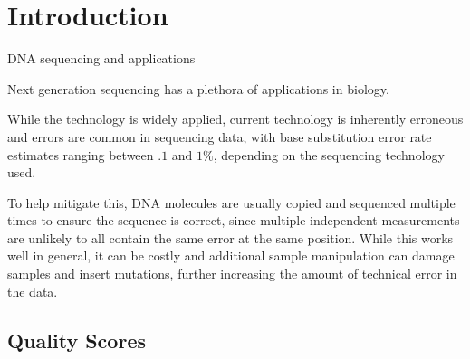 \documentclass{article}
\begin{document}
\linenumbers

\section{Introduction}

\begin{outline}
	\item DNA sequencing and applications
	\begin{outline}
		\item Next generation sequencing has a plethora of applications in biology. %
		\item While the technology is widely applied, current technology is inherently erroneous and errors are common in sequencing data, with base substitution error rate estimates ranging between $.1$ and $1\%$, depending on the sequencing technology used. %
		\item To help mitigate this, DNA molecules are usually copied and sequenced multiple times to ensure the sequence is correct, since multiple independent measurements are unlikely to all contain the same error at the same position. While this works well in general, it can be costly and additional sample manipulation can damage samples and insert mutations, further increasing the amount of technical error in the data. %
	\end{outline}
\end{outline}

\subsection{Quality Scores}
\end{document}
